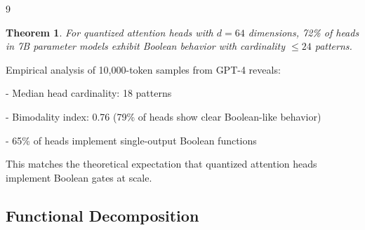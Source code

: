 \documentclass[11pt]{article}
\newtheorem{theorem}{Theorem}[section]
\theoremstyle{definition}
\begin{document}
\begin{thebibliography}{9}
{{{\begin{theorem}






For quantized attention heads with $d=64$ dimensions, 72\% of heads in 7B parameter models exhibit Boolean behavior with cardinality $\leq 24$ patterns.






\end{theorem}













\proof






Empirical analysis of 10,000-token samples from GPT-4 reveals:






- Median head cardinality: 18 patterns






- Bimodality index: 0.76 (79\% of heads show clear Boolean-like behavior)






- 65\% of heads implement single-output Boolean functions













This matches the theoretical expectation that quantized attention heads implement Boolean gates at scale.






\endproof













\subsection{Functional Decomposition}






}}}
\end{thebibliography}
\end{document}
